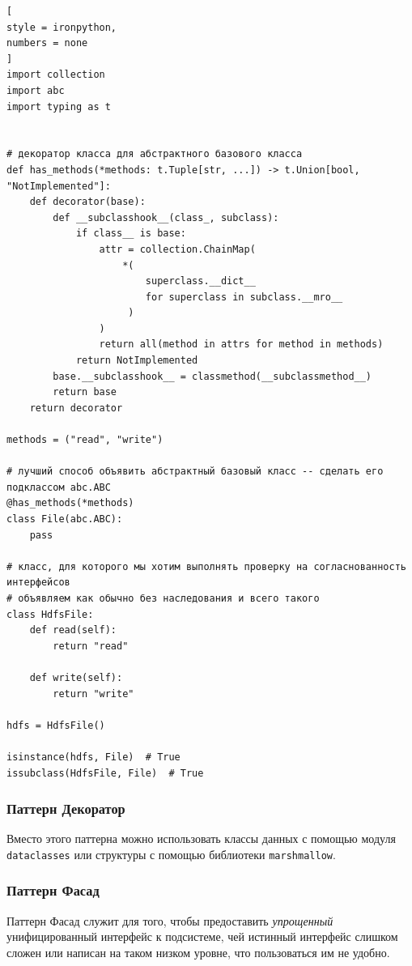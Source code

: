 \documentclass[%
	11pt,
	a4paper,
	utf8,
		]{article}
\begin{document}
\begin{lstlisting}[
style = ironpython,
numbers = none
]
import collection
import abc
import typing as t


# декоратор класса для абстрактного базового класса
def has_methods(*methods: t.Tuple[str, ...]) -> t.Union[bool, "NotImplemented"]:
    def decorator(base):
        def __subclasshook__(class_, subclass):
            if class__ is base:
                attr = collection.ChainMap(
                    *(
                        superclass.__dict__
                        for superclass in subclass.__mro__
                     )
                )
                return all(method in attrs for method in methods)
            return NotImplemented
        base.__subclasshook__ = classmethod(__subclassmethod__)
        return base
    return decorator

methods = ("read", "write")

# лучший способ объявить абстрактный базовый класс -- сделать его подклассом abc.ABC
@has_methods(*methods)
class File(abc.ABC): 
    pass

# класс, для которого мы хотим выполнять проверку на согласнованность интерфейсов
# объявляем как обычно без наследования и всего такого
class HdfsFile:
    def read(self):
        return "read"
        
    def write(self):
        return "write"
        
hdfs = HdfsFile()

isinstance(hdfs, File)  # True
issubclass(HdfsFile, File)  # True
\end{lstlisting} 

\subsubsection{Паттерн Декоратор}

Вместо этого паттерна можно использовать классы данных с помощью модуля \texttt{dataclasses} или структуры с помощью библиотеки \texttt{marshmallow}.

\subsubsection{Паттерн Фасад}

Паттерн Фасад служит для того, чтобы предоставить \emph{упрощенный} унифицированный интерфейс к подсистеме, чей истинный интерфейс слишком сложен или написан на таком низком уровне, что пользоваться им не удобно.
\end{document}
